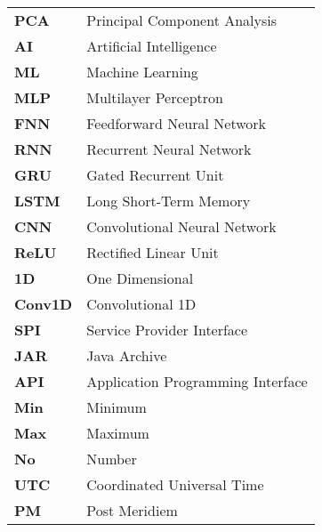 \begin{tabularx}{\textwidth}{@{}lL{0.8\textwidth}@{}}
    \textbf{PCA}  & Principal Component Analysis          \\
    \textbf{AI}   & Artificial Intelligence               \\
    \textbf{ML}     & Machine Learning                      \\
    \textbf{MLP}  & Multilayer Perceptron                 \\
    \textbf{FNN}  & Feedforward Neural Network            \\
    \textbf{RNN}  & Recurrent Neural Network              \\
    \textbf{GRU}  & Gated Recurrent Unit                  \\
    \textbf{LSTM} & Long Short-Term Memory                \\
    \textbf{CNN}  & Convolutional Neural Network          \\
    \textbf{ReLU} & Rectified Linear Unit                 \\
    \textbf{1D}   & One Dimensional                       \\
    \textbf{Conv1D} & Convolutional 1D                      \\

    \textbf{SPI}  & Service Provider Interface            \\
    \textbf{JAR}  & Java Archive                          \\
    \textbf{API}  & Application Programming Interface     \\

    \textbf{Min}  & Minimum                               \\
    \textbf{Max}  & Maximum                               \\
    \textbf{No}   & Number                                \\
    \textbf{UTC}  & Coordinated Universal Time            \\
    \textbf{PM}   & Post Meridiem                         \\
\end{tabularx}